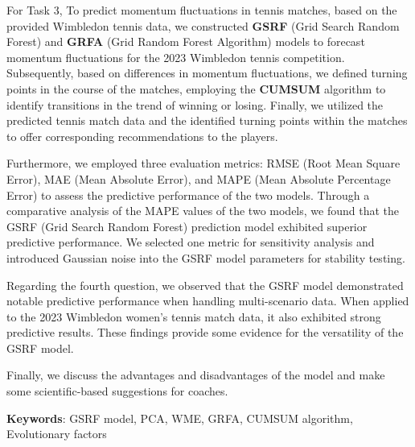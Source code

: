 \documentclass[12pt]{article}%
\begin{document}
For Task 3,  To predict momentum fluctuations in tennis matches, based on the provided Wimbledon tennis data, we constructed \textbf{GSRF} (Grid Search Random Forest) and \textbf{GRFA} (Grid Random Forest Algorithm) models to forecast momentum fluctuations for the 2023 Wimbledon tennis competition. Subsequently, based on differences in momentum fluctuations, we defined turning points in the course of the matches, employing the \textbf{CUMSUM} algorithm to identify transitions in the trend of winning or losing. Finally, we utilized the predicted tennis match data and the identified turning points within the matches to offer corresponding recommendations to the players.

Furthermore, we employed three evaluation metrics: RMSE (Root Mean Square Error), MAE (Mean Absolute Error), and MAPE (Mean Absolute Percentage Error) to assess the predictive performance of the two models. Through a comparative analysis of the MAPE values of the two models, we found that the GSRF (Grid Search Random Forest) prediction model exhibited superior predictive performance. We selected one metric for sensitivity analysis and introduced Gaussian noise into the GSRF model parameters for stability testing.

Regarding the fourth question, we observed that the GSRF model demonstrated notable predictive performance when handling multi-scenario data. When applied to the 2023 Wimbledon women's tennis match data, it also exhibited strong predictive results. These findings provide some evidence for the versatility of the GSRF model.

	Finally, we discuss the advantages and disadvantages of the model and make some scientific-based suggestions for coaches. 
	
	
	
	
	
	\vspace{5pt}
	\textbf{Keywords}: GSRF model, PCA, WME, GRFA, CUMSUM algorithm, Evolutionary factors
	
	
	
	\clearpage%
	\pagestyle{fancy}
	\newpage
	\thispagestyle{empty}
	
\end{document}
